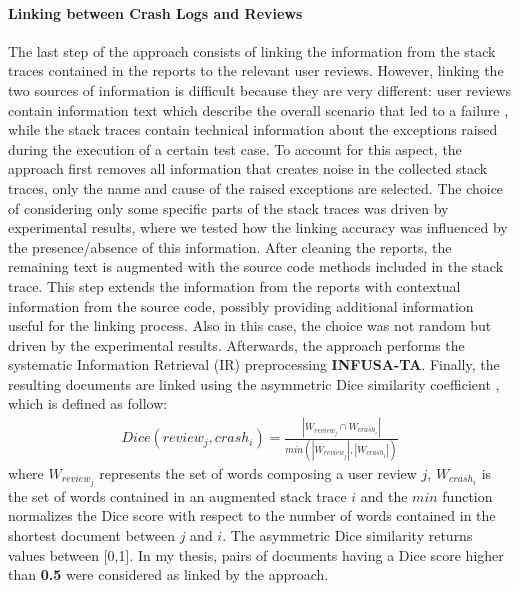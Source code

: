 \paragraph{Linking between Crash Logs and Reviews}
The last step of the approach consists of linking the information from the stack traces contained in the reports to the relevant user reviews. 
However, linking the two sources of information is difficult because they are very different: user reviews contain information text which describe the overall scenario that led to a failure \cite{mernik}, while the stack traces contain technical information about the exceptions raised during the execution of a certain test case. 
To account for this aspect, the approach first removes all information that creates noise in the collected stack traces, only the name and cause of the raised exceptions are selected. The choice of considering only some specific parts of the stack traces was driven by experimental results, where we tested how the linking accuracy was influenced by the presence/absence of this information. 
After cleaning the reports, the remaining text is augmented with the source code methods included in the stack trace. This step extends the information from the reports with contextual information from the source code, possibly providing additional information useful for the linking process. Also in this case, the choice was not random but driven by the experimental results.
Afterwards, the approach performs the systematic Information Retrieval (IR) preprocessing \cite{BaezaYates:1999} \textbf{INFUSA-TA}.
Finally, the resulting documents are linked using the asymmetric Dice similarity coefficient \cite{BaezaYates:1999}, which is defined as
follow: 
\begin{align*}
Dice (review_j, crash_i) = \frac{|W_{review_j} \cap W_{crash_i}|}{\textit{min}(|W_{review_j}|, |W_{crash_i}|)}
\end{align*}
where $W_{review_j}$ represents the set of words composing a user review $j$, $W_{crash_i}$ is the set of words contained in an augmented stack trace $i$ and the $min$ function normalizes the Dice score with respect to the number of words contained in the shortest document between $j$ and $i$. 
The asymmetric Dice similarity returns values between [0,1]. 
In my thesis, pairs of documents having a Dice score higher than \textbf{0.5} were considered as linked by the approach.






